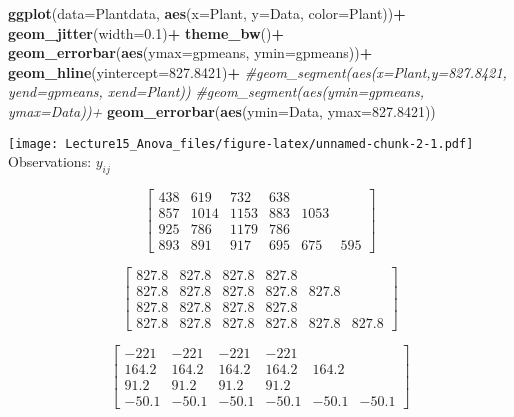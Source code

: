\documentclass[]{article}
\newenvironment{Shaded}{\begin{snugshade}}{\end{snugshade}}
\newcommand{\KeywordTok}[1]{\textcolor[rgb]{0.13,0.29,0.53}{\textbf{#1}}}
\newcommand{\DataTypeTok}[1]{\textcolor[rgb]{0.13,0.29,0.53}{#1}}
\newcommand{\FloatTok}[1]{\textcolor[rgb]{0.00,0.00,0.81}{#1}}
\newcommand{\StringTok}[1]{\textcolor[rgb]{0.31,0.60,0.02}{#1}}
\newcommand{\CommentTok}[1]{\textcolor[rgb]{0.56,0.35,0.01}{\textit{#1}}}
\newcommand{\OperatorTok}[1]{\textcolor[rgb]{0.81,0.36,0.00}{\textbf{#1}}}
\newcommand{\NormalTok}[1]{#1}
\begin{document}
\begin{Shaded}
\begin{Highlighting}[]
\KeywordTok{ggplot}\NormalTok{(}\DataTypeTok{data=}\NormalTok{Plantdata, }\KeywordTok{aes}\NormalTok{(}\DataTypeTok{x=}\NormalTok{Plant, }\DataTypeTok{y=}\NormalTok{Data, }\DataTypeTok{color=}\NormalTok{Plant))}\OperatorTok{+}
\StringTok{  }\KeywordTok{geom_jitter}\NormalTok{(}\DataTypeTok{width=}\FloatTok{0.1}\NormalTok{)}\OperatorTok{+}
\StringTok{  }\KeywordTok{theme_bw}\NormalTok{()}\OperatorTok{+}
\StringTok{  }\KeywordTok{geom_errorbar}\NormalTok{(}\KeywordTok{aes}\NormalTok{(}\DataTypeTok{ymax=}\NormalTok{gpmeans, }\DataTypeTok{ymin=}\NormalTok{gpmeans))}\OperatorTok{+}
\StringTok{  }\KeywordTok{geom_hline}\NormalTok{(}\DataTypeTok{yintercept=}\FloatTok{827.8421}\NormalTok{)}\OperatorTok{+}
\StringTok{  }\CommentTok{#geom_segment(aes(x=Plant,y=827.8421, yend=gpmeans, xend=Plant))}
\StringTok{  }\CommentTok{#geom_segment(aes(ymin=gpmeans, ymax=Data))+}
\StringTok{  }\KeywordTok{geom_errorbar}\NormalTok{(}\KeywordTok{aes}\NormalTok{(}\DataTypeTok{ymin=}\NormalTok{Data, }\DataTypeTok{ymax=}\FloatTok{827.8421}\NormalTok{))}
\end{Highlighting}
\end{Shaded}

\texttt{[image: Lecture15\_Anova\_files/figure-latex/unnamed-chunk-2-1.pdf]}
Observations: \(y_{ij}\)

\[\left[\begin{array}
{rrrrrr}
438 & 619 & 732 & 638 \\
857 & 1014 & 1153 & 883 & 1053 \\
925 & 786 & 1179 & 786 \\
893 & 891 & 917 & 695 & 675 & 595
\end{array}\right]
\]

\[\left[\begin{array}
{rrrrrr}
827.8 & 827.8 & 827.8 & 827.8 \\
827.8 & 827.8 & 827.8 & 827.8 & 827.8 \\
827.8 & 827.8 & 827.8 & 827.8 \\
827.8 & 827.8 & 827.8& 827.8 & 827.8 & 827.8
\end{array}\right]
\]

\[\left[\begin{array}
{rrrrrr}
-221 & -221  & -221  & -221  \\
164.2 & 164.2 & 164.2 & 164.2 & 164.2 \\
91.2 & 91.2 & 91.2 & 91.2 \\
-50.1 & -50.1 & -50.1& -50.1 & -50.1 & -50.1
\end{array}\right]
\]
\end{document}

